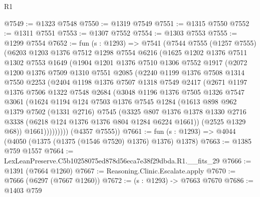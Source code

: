 \begin{lexlean}{R1}
\begin{coremodule}
@7549 := @1323 @7548
@7550 := @1319 @7549
@7551 := @1315 @7550
@7552 := @1311 @7551
@7553 := @1307 @7552
@7554 := @1303 @7553
@7555 := @1299 @7554
@7652 := fun (s : @1293) =>
  @7541
    (@7544
      @7555
      (@1257 @7555)
      (@6203
        @1203
        @1376
        @7512
        @1298
        @7554
        @6216
        (@1625
          @1202
          @1376
          @7511
          @1302
          @7553
          @1649
          (@1904
            @1201
            @1376
            @7510
            @1306
            @7552
            @1917
            (@2072
              @1200
              @1376
              @7509
              @1310
              @7551
              @2085
              (@2240
                @1199
                @1376
                @7508
                @1314
                @7550
                @2253
                (@2404
                  @1198
                  @1376
                  @7507
                  @1318
                  @7549
                  @2417
                  (@2671
                    @1197
                    @1376
                    @7506
                    @1322
                    @7548
                    @2684
                    (@3048
                      @1196
                      @1376
                      @7505
                      @1326
                      @7547
                      @3061
                      (@1624
                        @1194
                        @124
                        @7503
                        @1376
                        @7545
                        @1284
                        (@1613
                          @898
                          @962
                          @1379
                          @7502
                          (@1331 @2716)
                          @7545
                          (@3325
                            @807
                            @1376
                            @1378
                            @1330
                            @2716
                            @3338
                            (@6218 @124 @1376 @1376 @804 @1284 @6224 @1661))
                          (@2525 @1329 @68))
                        @1661)))))))))
      (@4357 @7555))
@7661 := fun (s : @1293) => @4044 (@4050 (@1375 (@1375 (@1546 @7520) @1376) @1376) @1378)
@7663 := @1385 @759 @1557
@7664 := LexLeanPreserve.C5b10258075ed878d56eca7e38f29dbda.R1.__fits_29
@7666 := @1391 (@7664 @1260)
@7667 := Reasoning.Clinic.Escalate.apply
@7670 := @7666 (@6297 (@7667 @1260))
@7672 := (s : @1293) -> @7663 @7670
@7686 := @1403
    @759

\end{coremodule}
\end{lexlean}
